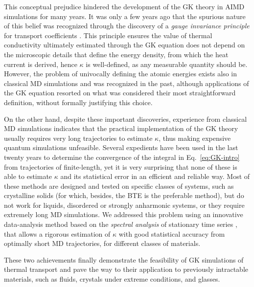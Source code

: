 This conceptual prejudice hindered the development of the GK theory in AIMD simulations for many years. It was only a few years ago that the spurious nature of this belief was recognized through the discovery of a \emph{gauge invariance principle} for transport coefficients \cite{Marcolongo2016,Ercole2016}. 
This principle ensures the value of thermal conductivity ultimately estimated through the GK equation does not depend on the microscopic details that define the energy density, from which the heat current is derived, hence $\kappa$ is well-defined, as any measurable quantity should be. 
However, the problem of univocally defining the atomic energies exists also in classical MD simulations and was recognized in the past, although applications of the GK equation resorted on what was considered their most straightforward definition, without formally justifying this choice. 

On the other hand, despite these important discoveries, experience from classical MD simulations indicates that the practical implementation of the GK theory usually requires very long trajectories to estimate $\kappa$, thus making expensive quantum simulations unfeasible. 
Several expedients have been used in the last twenty years to determine the convergence of the integral in Eq.~\eqref{eq:GK-intro} from trajectories of finite-length, yet it is very surprising that none of these is able to estimate $\kappa$ and its statistical error in an efficient and reliable way. Most of these methods are designed and tested on specific classes of systems, such as crystalline solids (for which, besides, the BTE is the preferable method), but do not work for liquids, disordered or strongly anharmonic systems, or they require extremely long MD simulations. 
We addressed this problem using an innovative data-analysis method based on the \emph{spectral analysis} of stationary time series \cite{Ercole2017}, that allows a rigorous estimation of $\kappa$ with good statistical accuracy from optimally short MD trajectories, for different classes of materials. 

These two achievements finally demonstrate the feasibility of \abinitio GK simulations of thermal transport and pave the way to their application to previously intractable materials, such as fluids, crystals under extreme conditions, and glasses. 



